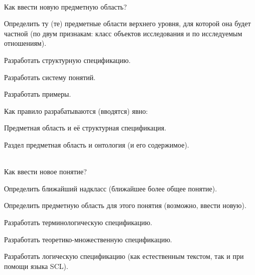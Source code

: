 \begin{frame}{\\Как ввести новую предметную область?}
	\topline
	\justifying
	\vspace{8mm}
	
\begin{textitemize}
	\item Определить ту (те) предметные области верхнего уровня, для которой она будет частной (по двум признакам: класс объектов исследования и по исследуемым отношениям).
	\item Разработать структурную спецификацию. 
	\item Разработать систему понятий. 
	\item Разработать примеры.
\end{textitemize}
\bigskip
Как правило разрабатываются (вводятся) явно:
\begin{textitemize}
	\item Предметная область и её структурная спецификация.
	\item Раздел предметная область и онтология (и его содержимое). 
\end{textitemize}

\end{frame}


\begin{frame}{\\Как ввести новое понятие?}
	\topline
	\justifying
	\vspace{8mm}
	
	\begin{textitemize}
		\item Определить ближайший надкласс (ближайшее более общее понятие). 
		\item Определить предметную область для этого понятия (возможно, ввести новую). 
		\item Разработать терминологическую спецификацию. 
		\item Разработать теоретико-множественную спецификацию.
		\item Разработать логическую спецификацию (как естественным текстом, так и при помощи языка SCL).
	\end{textitemize}
	
\end{frame}



